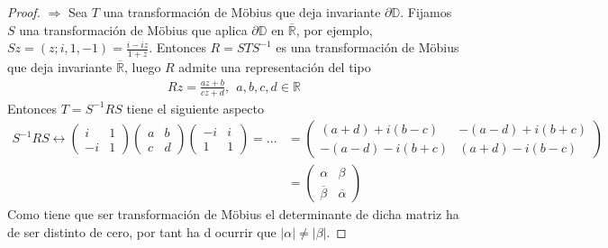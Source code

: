 \begin{proof}
    $\Longrightarrow$ Sea $T$ una transformación de M\"obius que deja invariante $\partial \mathbb{D}$. Fijamos $S$ una transformación de M\"obius que aplica $\partial \mathbb{D}$ en $\overline{\mathbb{R}}$, por ejemplo, $Sz = (z;i,1,-1) = \frac{i -iz}{1+z}$. Entonces $R = STS^{-1}$ es una transformación de M\"obius que deja invariante $\overline{\mathbb{R}}$, luego $R$ admite una representación del tipo
    \begin{align*}
        Rz = \frac{az + b}{cz + d}, \ \ a,b,c,d \in \mathbb{R}
    \end{align*}
    Entonces $T = S^{-1}RS$ tiene el siguiente aspecto
    \begin{align*}
        S^{-1}RS \longleftrightarrow \begin{pmatrix}
                                         i  & 1 \\
                                         -i & 1
                                     \end{pmatrix} \begin{pmatrix}
                                                       a & b \\
                                                       c & d
                                                   \end{pmatrix} \begin{pmatrix}
                                                                     -i & i \\
                                                                     1  & 1
                                                                 \end{pmatrix} = ... & = \begin{pmatrix}
                                                                                             (a+d) + i(b-c)  & -(a-d) + i(b+c) \\
                                                                                             -(a-d) - i(b+c) & (a+d) - i(b-c)
                                                                                         \end{pmatrix} \\
                                                     & = \begin{pmatrix}
                                                             \alpha           & \beta             \\
                                                             \overline{\beta} & \overline{\alpha}
                                                         \end{pmatrix}
    \end{align*}
    Como tiene que ser transformación de M\"obius el determinante de dicha matriz ha de ser distinto de cero, por tant ha d ocurrir que $|\alpha| \not = |\beta|$.


\end{proof}
